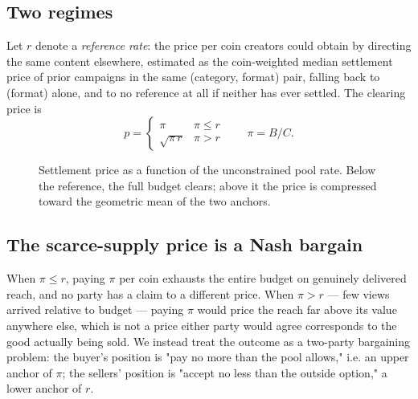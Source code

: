 \documentclass[11pt]{article}
\begin{document}
\subsection{Two regimes}

Let $r$ denote a \emph{reference rate}: the price per coin creators could obtain by directing the
same content elsewhere, estimated as the coin-weighted median settlement price of prior campaigns
in the same (category, format) pair, falling back to (format) alone, and to no reference at all if
neither has ever settled. The clearing price is
$$
p =
\begin{cases}
\pi & \pi \le r \\
\sqrt{\pi \, r} & \pi > r
\end{cases}
\qquad \pi = B/C. \label{eq:settle}
$$

\begin{figure}[h]
\centering
{}
\caption{Settlement price as a function of the unconstrained pool rate. Below the reference, the
full budget clears; above it the price is compressed toward the geometric mean of the two anchors.}
\label{fig:price}
\end{figure}

\subsection{The scarce-supply price is a Nash bargain}

When $\pi \le r$, paying $\pi$ per coin exhausts the entire budget on genuinely delivered reach,
and no party has a claim to a different price. When $\pi > r$ — few views arrived relative to
budget — paying $\pi$ would price the reach far above its value anywhere else, which is not a price
either party would agree corresponds to the good actually being sold. We instead treat the outcome
as a two-party bargaining problem: the buyer's position is "pay no more than the pool allows,"
i.e. an upper anchor of $\pi$; the sellers' position is "accept no less than the outside option,"
a lower anchor of $r$.
\end{document}
